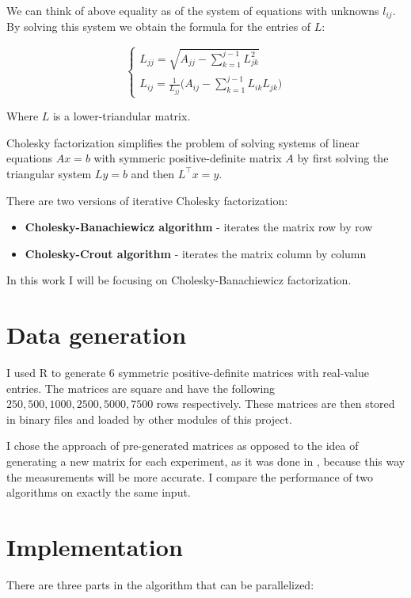 \documentclass[sigplan]{acmart}
\begin{document}
We can think of above equality as of the system of equations with unknowns $l_{ij}$. By solving this system we obtain the formula for the entries of $L$:

\[
    \begin{cases}
        L_{jj} = \sqrt{A_{jj} - \sum_{k=1}^{j-1}L_{jk}^2} \\
        L_{ij} = \frac{1}{L_{jj}} \bigg( A_{ij} - \sum_{k=1}^{j-1}L_{ik}L_{jk} \bigg)
    \end{cases}
\]

Where $L$ is a lower-triandular matrix.

Cholesky factorization simplifies the problem of solving systems of linear equations $Ax = b$ with symmeric positive-definite matrix $A$ by first solving the triangular system $Ly = b$ and then $L^\top x = y$.

There are two versions of iterative Cholesky factorization:

\begin{itemize}
	\item \textbf{Cholesky-Banachiewicz algorithm} -  iterates the matrix row by row
	\item \textbf{Cholesky-Crout algorithm} - iterates the matrix column by column
\end{itemize}

In this work I will be focusing on Cholesky-Banachiewicz factorization.

\section{Data generation}
\label{data}

I used R to generate 6 symmetric positive-definite matrices with real-value entries. The matrices are square and have the following $250, 500, 1000, 2500, 5000, 7500$ rows respectively. These matrices are then stored in binary files and loaded by other modules of this project.

I chose the approach of pre-generated matrices as opposed to the idea of generating a new matrix for each experiment, as it was done in \cite{Tarasconi}, because this way the measurements will be more accurate. I compare the performance of two algorithms on exactly the same input.

\section{Implementation}
There are three parts in the algorithm that can be parallelized:
\end{document}
